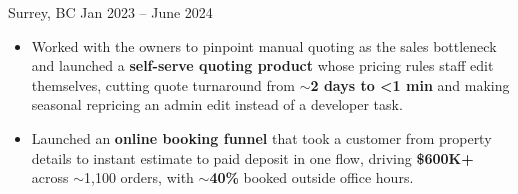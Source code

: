 \documentclass[letterpaper,11pt]{article}
\newcommand{\BulletItems}[1]{
  \item
    \begin{itemize}[label={-}, leftmargin=*, labelsep=0.3em, topsep=0pt, partopsep=0pt, itemsep=0pt, parsep=0pt]
      \small #1
    \end{itemize}\vspace{-5pt}
}
\begin{document}
      {Surrey, BC}
      {Jan 2023 -- June 2024}
    \BulletItems{
      \item Worked with the owners to pinpoint manual quoting as the sales bottleneck and launched a \textbf{self-serve quoting product} whose pricing rules staff edit themselves, cutting quote turnaround from \textbf{$\sim$2 days to \textless{}1 min} and making seasonal repricing an admin edit instead of a developer task.
      \item Launched an \textbf{online booking funnel} that took a customer from property details to instant estimate to paid deposit in one flow, driving \textbf{\$600K+} across $\sim$1{,}100 orders, with \textbf{$\sim$40\%} booked outside office hours.
}
\end{document}
